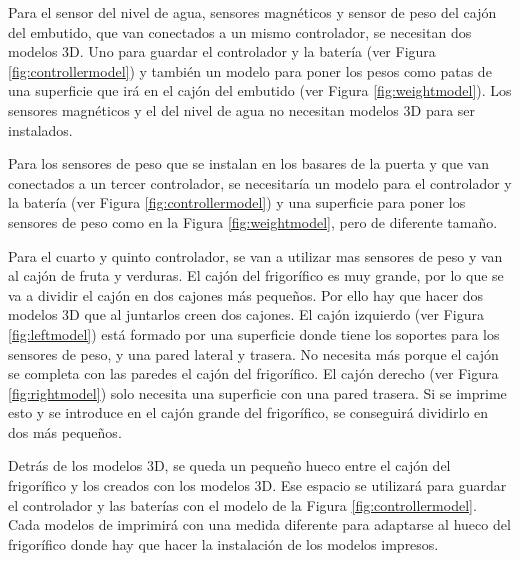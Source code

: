 Para el sensor del nivel de agua, sensores magnéticos y sensor de peso del cajón del embutido, que van conectados a un mismo controlador, se necesitan dos modelos 3D. Uno para guardar el controlador y la batería (ver Figura \ref{fig:controllermodel}) y también un modelo para poner los pesos como patas de una superficie que irá en el cajón del embutido (ver Figura \ref{fig:weightmodel}). Los sensores magnéticos y el del nivel de agua no necesitan modelos 3D para ser instalados.

Para los sensores de peso que se instalan en los basares de la puerta y que van conectados a un tercer controlador, se necesitaría un modelo para el controlador y la batería (ver Figura \ref{fig:controllermodel}) y una superficie para poner los sensores de peso como en la Figura \ref{fig:weightmodel}, pero de diferente tamaño.

Para el cuarto y quinto controlador, se van a utilizar mas sensores de peso y van al cajón de fruta y verduras. El cajón del frigorífico es muy grande, por lo que se va a dividir el cajón en dos cajones más pequeños. Por ello hay que hacer dos modelos 3D que al juntarlos creen dos cajones. El cajón izquierdo (ver Figura \ref{fig:leftmodel}) está formado por una superficie donde tiene los soportes para los sensores de peso, y una pared lateral y trasera. No necesita más porque el cajón se completa con las paredes el cajón del frigorífico. El cajón derecho (ver Figura \ref{fig:rightmodel}) solo necesita una superficie con una pared trasera. Si se imprime esto y se introduce en el cajón grande del frigorífico, se conseguirá dividirlo en dos más pequeños.

Detrás de los modelos 3D, se queda un pequeño hueco entre el cajón del frigorífico y los creados con los modelos 3D. Ese espacio se utilizará para guardar el controlador y las baterías con el modelo de la Figura \ref{fig:controllermodel}. Cada modelos de imprimirá con una medida diferente para adaptarse al hueco del frigorífico donde hay que hacer la instalación de los modelos impresos.

